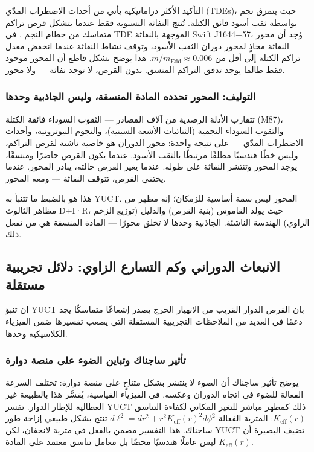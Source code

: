 \documentclass[12pt,a4paper]{article}
\begin{document}
	التأكيد الأكثر دراماتيكية يأتي من أحداث الاضطراب المدّي (TDEs)، حيث يتمزق نجم بواسطة ثقب أسود فائق الكتلة. تُنتج النفاثة النسبوية فقط عندما يتشكل قرص تراكم متماسك من حطام النجم \cite{TDE2016,TDE2020}. في TDE الموجهة بالنفاثة Swift J1644+57، وُجد أن محور النفاثة محاذٍ لمحور دوران الثقب الأسود، وتوقف نشاط النفاثة عندما انخفض معدل تراكم الكتلة إلى أقل من \(\dot{m}/\dot{m}_{\text{Edd}} \approx 0.006\). هذا يوضح بشكل قاطع أن المحور موجود فقط طالما يوجد تدفق التراكم المنسق. بدون القرص، لا توجد نفاثة — ولا محور.
	
	\subsubsection{التوليف: المحور تحدده المادة المنسقة، وليس الجاذبية وحدها}
	
	تتقارب الأدلة الرصدية من آلاف المصادر — الثقوب السوداء فائقة الكتلة (M87)، والثقوب السوداء النجمية (الثنائيات الأشعة السينية)، والنجوم النيوترونية، وأحداث الاضطراب المدّي — على نتيجة واحدة: محور الدوران هو خاصية ناشئة لقرص التراكم، وليس خطًا هندسيًا مطلقًا مرتبطًا بالثقب الأسود. عندما يكون القرص حاضرًا ومنسقًا، يوجد المحور وتنتشر النفاثة على طوله. عندما يغير القرص حالته، يبادر المحور. عندما يختفي القرص، تتوقف النفاثة — ومعه المحور.
	
	هذا هو بالضبط ما تتنبأ به YUCT. المحور ليس سمة أساسية للزمكان؛ إنه مظهر من مظاهر الثالوث D+I·R، حيث يولد القاموس (بنية القرص) والدليل (توزيع الزخم الزاوي) الهندسة الناشئة. الجاذبية وحدها لا تخلق محورًا — المادة المنسقة هي من تفعل ذلك.
	
	\subsection{الانبعاث الدوراني وكم التسارع الزاوي: دلائل تجريبية مستقلة}
	
	إن تنبؤ YUCT بأن القرص الدوار القريب من الانهيار الحرج يصدر إشعاعًا متماسكًا يجد دعمًا في العديد من الملاحظات التجريبية المستقلة التي يصعب تفسيرها ضمن الفيزياء الكلاسيكية وحدها.
	
	\subsubsection{تأثير ساجناك وتباين الضوء على منصة دوارة}
	
	يوضح تأثير ساجناك أن الضوء لا ينتشر بشكل متناحٍ على منصة دوارة: تختلف السرعة الفعالة للضوء في اتجاه الدوران وعكسه. في الفيزياء القياسية، يُفسَّر هذا بالطبيعة غير العطالية للإطار الدوار. تفسر YUCT ذلك كمظهر مباشر للتغير المكاني لكفاءة التناسق \(K_{\mathrm{eff}}(r)\): المترية الفعالة \(d\ell^2 = dr^2 + r^2 K_{\mathrm{eff}}(r)^2 d\phi^2\) تنتج بشكل طبيعي إزاحة طور ساجناك. هذا التفسير مضمن بالفعل في مترية لانجفان، لكن YUCT تضيف البصيرة أن \(K_{\mathrm{eff}}(r)\) ليس عاملًا هندسيًا محضًا بل معامل تناسق معتمد على المادة.
	
\end{document}
